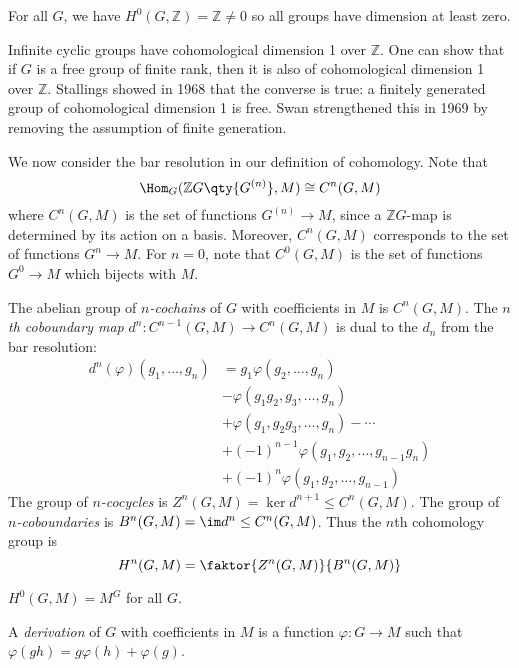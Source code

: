 \begin{remark}
    For all \( G \), we have \( H^0(G, \mathbb Z) = \mathbb Z \neq 0 \) so all groups have dimension at least zero.
\end{remark}
\begin{example}
    Infinite cyclic groups have cohomological dimension 1 over \( \mathbb Z \).
    One can show that if \( G \) is a free group of finite rank, then it is also of cohomological dimension 1 over \( \mathbb Z \).
    Stallings showed in 1968 that the converse is true: a finitely generated group of cohomological dimension 1 is free.
    Swan strengthened this in 1969 by removing the assumption of finite generation.
\end{example}
We now consider the bar resolution in our definition of cohomology.
Note that
\[ \Hom_G(\mathbb Z G \qty{G^{(n)}}, M) \cong C^n(G, M) \]
where \( C^n(G, M) \) is the set of functions \( G^{(n)} \to M \), since a \( \mathbb Z G \)-map is determined by its action on a basis.
Moreover, \( C^n(G, M) \) corresponds to the set of functions \( G^n \to M \).
For \( n = 0 \), note that \( C^0(G, M) \) is the set of functions \( G^0 \to M \) which bijects with \( M \).
\begin{definition}
    The abelian group of \emph{\( n \)-cochains} of \( G \) with coefficients in \( M \) is \( C^n(G, M) \).
    The \emph{\( n \)th coboundary map} \( d^n : C^{n-1}(G, M) \to C^n(G, M) \) is dual to the \( d_n \) from the bar resolution:
    \begin{align*}
        d^n(\varphi)(g_1, \dots, g_n) &= g_1 \varphi(g_2, \dots, g_n) \\
        &- \varphi(g_1 g_2, g_3, \dots, g_n) \\
        &+ \varphi(g_1, g_2 g_3, \dots, g_n) - \cdots \\
        &+ (-1)^{n-1} \varphi(g_1, g_2, \dots, g_{n-1} g_n) \\
        &+ (-1)^n \varphi(g_1, g_2, \dots, g_{n-1})
    \end{align*}
    The group of \emph{\( n \)-cocycles} is \( Z^n(G, M) = \ker d^{n+1} \leq C^n(G, M) \).
    The group of \emph{\( n \)-coboundaries} is \( B^n(G, M) = \im d^n \leq C^n(G, M) \).
    Thus the \( n \)th cohomology group is
    \[ H^n(G, M) = \faktor{Z^n(G, M)}{B^n(G, M)} \]
\end{definition}
\begin{corollary}
    \( H^0(G, M) = M^G \) for all \( G \).
\end{corollary}
\begin{definition}
    A \emph{derivation} of \( G \) with coefficients in \( M \) is a function \( \varphi : G \to M \) such that \( \varphi(gh) = g \varphi(h) + \varphi(g) \).
\end{definition}
